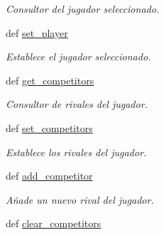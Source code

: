 \begin{DoxyCompactItemize}
\begin{DoxyCompactList}\small\item\em \-Consultor del jugador seleccionado. \end{DoxyCompactList}\item 
def \hyperlink{classengine_1_1config_1_1Config_aa0a33212f574a70d5cf19503231790c0}{set\-\_\-player}
\begin{DoxyCompactList}\small\item\em \-Establece el jugador seleccionado. \end{DoxyCompactList}\item 
def \hyperlink{classengine_1_1config_1_1Config_a999ff87bdd2faf4a3f27115aa6b4f9c5}{get\-\_\-competitors}
\begin{DoxyCompactList}\small\item\em \-Consultor de rivales del jugador. \end{DoxyCompactList}\item 
def \hyperlink{classengine_1_1config_1_1Config_ab7428ac81f4d9bafe6a2a99b793ddcf5}{set\-\_\-competitors}
\begin{DoxyCompactList}\small\item\em \-Establece los rivales del jugador. \end{DoxyCompactList}\item 
def \hyperlink{classengine_1_1config_1_1Config_ac90febfe15cf60b0cd54b4305b67555f}{add\-\_\-competitor}
\begin{DoxyCompactList}\small\item\em \-Añade un nuevo rival del jugador. \end{DoxyCompactList}\item 
\hypertarget{classengine_1_1config_1_1Config_a34da11968967575b01979866bd1f6975}{
def \hyperlink{classengine_1_1config_1_1Config_a34da11968967575b01979866bd1f6975}{clear\-\_\-competitors}}
\label{classengine_1_1config_1_1Config_a34da11968967575b01979866bd1f6975}


\end{DoxyCompactItemize}
